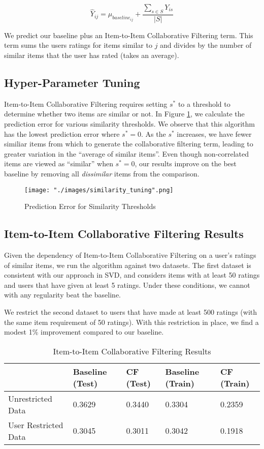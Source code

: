 \documentclass[12pt]{article}
\begin{document}
$$ \hat Y_{ij} = \mu_{baseline_{ij}} + \frac{\sum\limits_{s \in S} Y_{is}}{|S|}$$

We predict our baseline plus an Item-to-Item Collaborative Filtering term.\textsuperscript{\cite{gower}} This term sums the users ratings for items similar to $j$ and divides by the number of similar items that the user has rated (takes an average).

\subsection*{Hyper-Parameter Tuning}
Item-to-Item Collaborative Filtering requires setting $s^*$ to a threshold to determine whether two items are similar or not. In Figure \ref{fig:similarity_tuning}, we calculate the prediction error for various similarity thresholds. We observe that this algorithm has the lowest prediction error where $s^* = 0$. As the $s^*$ increases, we have fewer similiar items from which to generate the collaborative filtering term, leading to greater variation in the ``average of similar items''. Even though non-correlated items are viewed as ``similar'' when $s^* = 0$, our results improve on the best baseline by removing all \textit{dissimilar} items from the comparison.

\begin{figure}[!ht]
\centering
    \texttt{[image: "./images/similarity\_tuning".png]}
    \caption{Prediction Error for Similarity Thresholds}
    \label{fig:similarity_tuning}
\end{figure}

\subsection*{Item-to-Item Collaborative Filtering Results}

Given the dependency of Item-to-Item Collaborative Filtering on a user's ratings of similar items, we run the algorithm against two datasets. The first dataset is consistent with our approach in SVD, and considers items with at least 50 ratings and users that have given at least 5 ratings. Under these conditions, we cannot with any regularity beat the baseline.

We restrict the second dataset to users that have made at least 500 ratings (with the same item requirement of 50 ratings). With this restriction in place, we find a modest 1\% improvement compared to our baseline.

\begin{table}[ht!]
\centering
\caption{Item-to-Item Collaborative Filtering Results}
\label{my-label}
\begin{tabular}{lllll}
\hline
                        & Baseline (Test) & CF (Test) & Baseline (Train) & CF (Train) \\ \hline
Unrestricted Data     & 0.3629             & 0.3440                  & 0.3304              & 0.2359                   \\
User Restricted Data  & 0.3045             & 0.3011                  & 0.3042              & 0.1918                   \\ \hline
\end{tabular}
\end{table}
\end{document}
